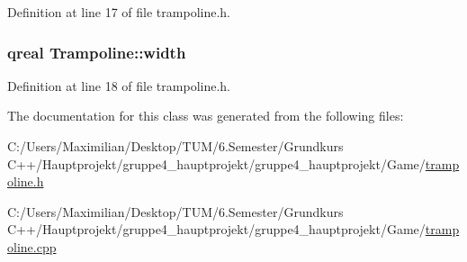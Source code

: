 Definition at line 17 of file trampoline.\+h.

\subsubsection[{\texorpdfstring{width}{width}}]{\setlength{\rightskip}{0pt plus 5cm}qreal Trampoline\+::width}\hypertarget{class_trampoline_abc6d02536d9caeb1c1d80c545ebae044}{}\label{class_trampoline_abc6d02536d9caeb1c1d80c545ebae044}


Definition at line 18 of file trampoline.\+h.



The documentation for this class was generated from the following files\+:\begin{DoxyCompactItemize}
\item 
C\+:/\+Users/\+Maximilian/\+Desktop/\+T\+U\+M/6.\+Semester/\+Grundkurs C++/\+Hauptprojekt/gruppe4\+\_\+hauptprojekt/gruppe4\+\_\+hauptprojekt/\+Game/\hyperlink{trampoline_8h}{trampoline.\+h}\item 
C\+:/\+Users/\+Maximilian/\+Desktop/\+T\+U\+M/6.\+Semester/\+Grundkurs C++/\+Hauptprojekt/gruppe4\+\_\+hauptprojekt/gruppe4\+\_\+hauptprojekt/\+Game/\hyperlink{trampoline_8cpp}{trampoline.\+cpp}\end{DoxyCompactItemize}
